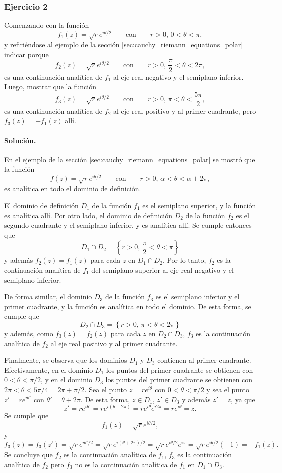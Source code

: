 \documentclass[a4paper]{report}
\begin{document}
\subsubsection{Ejercicio 2}

Comenzando con la función
\[
 f_1(z)=\sqrt{r}e^{i\theta/2}\qquad\textrm{con}\qquad r>0,\,0<\theta<\pi,
\]
y refiriéndose al ejemplo de la sección \ref{sec:cauchy_riemann_equations_polar} indicar porque
\[
 f_2(z)=\sqrt{r}e^{i\theta/2}\qquad\textrm{con}\qquad r>0,\,\frac{\pi}{2}<\theta<2\pi,
\]
es una continuación analítica de \(f_1\) al eje real negativo y el semiplano inferior. Luego, mostrar que la función 
\[
 f_3(z)=\sqrt{r}e^{i\theta/2}\qquad\textrm{con}\qquad r>0,\,\pi<\theta<\frac{5\pi}{2},
\]
es una continuación analítica de \(f_2\) al eje real positivo y al primer cuadrante, pero \(f_3(z)=-f_1(z)\) allí.

\paragraph{Solución.} En el ejemplo de la sección \ref{sec:cauchy_riemann_equations_polar} se mostró que la función 
\[
 f(z)=\sqrt{r}e^{i\theta/2}\qquad\textrm{con}\qquad r>0,\,\alpha<\theta<\alpha+2\pi,
\]
es analítica en todo el dominio de definición. 

El dominio de definición \(D_1\) de la función \(f_1\) es el semiplano superior, y la función es analítica allí. Por otro lado, el dominio de definición \(D_2\) de la función \(f_2\) es el segundo cuadrante y el semiplano inferior, y es analítica allí. Se cumple entonces que 
\[
 D_1\cap D_2=\left\{r>0,\,\frac{\pi}{2}<\theta<\pi\right\}
\]
y además \(f_2(z)=f_1(z)\) para cada \(z\) en \(D_1\cap D_2\). Por lo tanto, \(f_2\) es la continuación analítica de \(f_1\) del semiplano superior al eje real negativo y el semiplano inferior.

De forma similar, el dominio \(D_3\) de la función \(f_3\) es el semiplano inferior y el primer cuadrante, y la función es analítica en todo el dominio. De esta forma, se cumple que 
\[
 D_2\cap D_3=\left\{r>0,\,\pi<\theta<2\pi\right\}
\]
y además, como \(f_3(z)=f_2(z)\) para cada \(z\) en \(D_2\cap D_3\), \(f_3\) es la continuación analítica de \(f_2\) al eje real positivo y al primer cuadrante.

Finalmente, se observa que los dominios \(D_1\) y \(D_3\) contienen al primer cuadrante. Efectivamente, en el dominio \(D_1\) los puntos del primer cuadrante se obtienen con \(0<\theta<\pi/2\), y en el dominio \(D_3\) los puntos del primer cuadrante se obtienen con \(2\pi<\theta<5\pi/4=2\pi+\pi/2\). Sea el punto \(z=re^{i\theta}\) con \(0<\theta<\pi/2\) y sea el punto \(z'=re^{i\theta'}\) con \(\theta'=\theta+2\pi\). De esta forma, \(z\in D_1\), \(z'\in D_3\) y además \(z'=z\), ya que
\[
 z'=re^{i\theta'}=re^{i(\theta+2\pi)}=re^{i\theta}e^{i2\pi}=re^{i\theta}=z.
\]
Se cumple que 
\[
 f_1(z)=\sqrt{r}e^{i\theta/2},
\]
y
\[
 f_3(z)=f_3(z')=\sqrt{r}e^{i\theta'/2}=\sqrt{r}e^{i(\theta+2\pi)/2}=\sqrt{r}e^{i\theta/2}e^{i\pi}=\sqrt{r}e^{i\theta/2}(-1)=-f_1(z).
\]
Se concluye que \(f_2\) es la continuación analítica de \(f_1\), \(f_3\) es la continuación analítica de \(f_2\) pero \(f_3\) no es la continuación analítica de \(f_1\) en \(D_1\cap D_3\).
\end{document}
